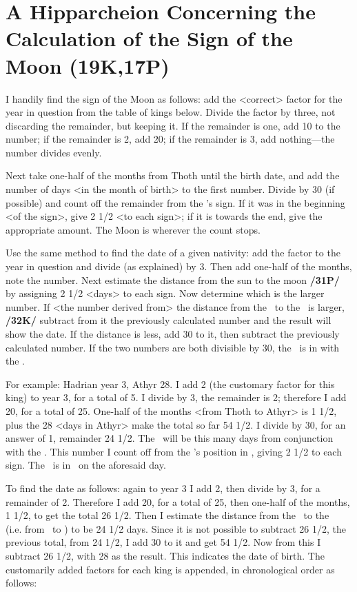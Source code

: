 \section{A Hipparcheion Concerning the Calculation of the Sign of the Moon (19K,17P)}
I handily find the sign of the Moon as follows: add the <correct> factor for the year in question from the table of kings below. Divide the factor by three, not discarding the remainder, but keeping it. If the remainder is one, add 10 to the number; if the remainder is 2, add 20; if the remainder is 3, add nothing—the number divides evenly. 

Next take one-half of the months from Thoth until the birth date, and add the number of days <in the month of birth> to the first number. Divide by 30 (if possible) and count off the remainder from the \Sun’s sign. If it was in the beginning <of the sign>, give 2 1/2 <to each sign>; if it is towards the end, give the appropriate amount. The Moon is wherever the count stops.

Use the same method to find the date of a given nativity: add the factor to the year in question and divide (as explained) by 3. Then add one-half of the months, note the number. Next estimate the distance from the sun to the moon \textbf{/31P/} by assigning 2 1/2 <days> to each sign. Now determine which is the larger number. If <the number derived from> the distance from the \Sun\, to the \Moon\, is larger, \textbf{/32K/} subtract from it the previously calculated number and the result will show the date. If the distance is less, add 30 to it, then subtract the previously calculated number. If the two numbers are both divisible by 30, the \Moon\, is in \Conjunction with the \Sun.

For example: Hadrian year 3, Athyr 28. I add 2 (the customary factor for this king) to year 3, for a total of 5. I divide by 3, the remainder is 2; therefore I add 20, for a total of 25. One-half of the months <from Thoth to Athyr> is 1 1/2, plus the 28 <days in Athyr> make the total so far 54 1/2. I divide by 30, for an answer of 1, remainder 24 1/2. The \Moon\, will be this many days from conjunction with the \Sun. This number I count off from the \Sun’s position in \Sagittarius, giving 2 1/2 to each sign. The \Moon\, is in \Virgo\, on the aforesaid day.

To find the date as follows: again to year 3 I add 2, then divide by 3, for a remainder of 2. Therefore I add 20, for a total of 25, then one-half of the months, 1 1/2, to get the total 26 1/2. Then I estimate the distance from the \Sun\, to the \Moon\, (i.e. from \Sagittarius\, to \Virgo) to be 24 1/2 days. Since it is not possible to subtract 26 1/2, the previous total, from 24 1/2, I add 30 to it and get 54 1/2. Now from this I subtract 26 1/2, with 28 as the result. This indicates the date of birth. The customarily added factors for each king is appended, in chronological order as follows:


